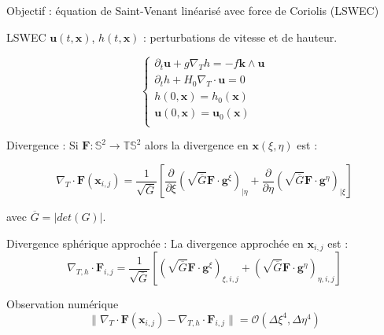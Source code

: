 \documentclass[11pt]{beamer}
\begin{document}
\begin{frame}{Objectif : équation de Saint-Venant linéarisé avec force de Coriolis (LSWEC)}

\begin{block}{LSWEC}
$\mathbf{u}( t, \mathbf{x}) $, $h( t, \mathbf{x})$ : perturbations de vitesse et de hauteur.

\begin{equation}
\left \{
\begin{array}{l}
\partial_t \mathbf{u}+g \nabla_T h  = - f \mathbf{k} \wedge \mathbf{u}\\
\partial_t h + H_0 \nabla_T \cdot \mathbf{u} = 0\\
h(0, \mathbf{x} ) = h_0 ( \mathbf{x} )\\
\mathbf{u}(0, \mathbf{x} ) = \mathbf{u}_0 ( \mathbf{x} )\\
\end{array}
\right.
\label{eq:LSWEC}
\end{equation}
\end{block}

\begin{block}{Divergence :}
Si $\mathbf{F} : \mathbb{S}^2 \rightarrow \mathbb{T}\mathbb{S}^2$ alors la divergence en $\mathbf{x}(\xi, \eta)$ est :

\begin{equation*}
\nabla_T \cdot  \mathbf{F} ( \mathbf{x}_{i,j} ) = \dfrac{1}{\sqrt{\overline{G}}} \left[ \dfrac{\partial}{\partial \xi} \left( \sqrt{\overline{G}} \mathbf{F} \cdot \mathbf{g}^{\xi}   \right)_{| \eta} + \dfrac{\partial}{\partial \eta} \left( \sqrt{\overline{G}} \mathbf{F} \cdot \mathbf{g}^{\eta}   \right)_{| \xi}\right]
\end{equation*}
\end{block}

avec $\overline{G} = | det \left( G \right) |$.
\end{frame}



\begin{frame}
\begin{block}{Divergence sphérique approchée :}
La divergence approchée en $\mathbf{x}_{i,j}$ est :
\begin{equation*}
\nabla_{T,h} \cdot \mathbf{F}_{i,j} = \dfrac{1}{\sqrt{\overline{G}}} \left[  \left( \sqrt{\overline{G}} \mathbf{F} \cdot \mathbf{g}^{\xi}   \right)_{\xi, i, j} +  \left( \sqrt{\overline{G}} \mathbf{F} \cdot \mathbf{g}^{\eta}   \right)_{\eta, i, j}\right]
\end{equation*}
\end{block}

\begin{block}{Observation numérique}
$$\| \nabla_T \cdot \mathbf{F} ( \mathbf{x}_{i,j} )  - \nabla_{T,h} \cdot \mathbf{F}_{i,j}  \| = \mathcal{O} \left( \Delta \xi^4, \Delta \eta^4 \right)$$
\end{block}

\end{frame}
\end{document}
